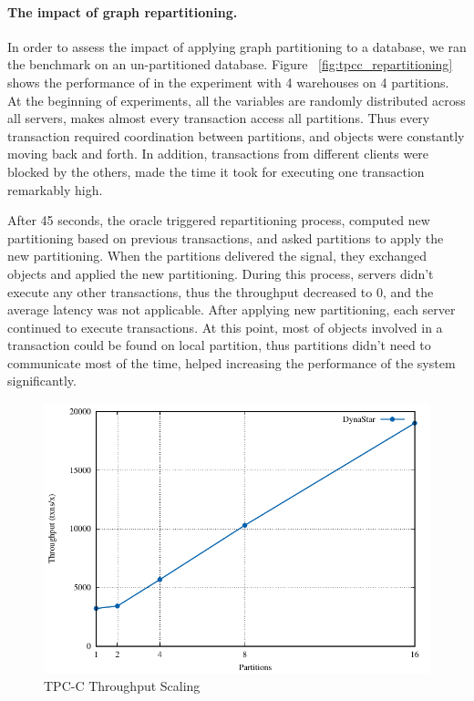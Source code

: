 \paragraph{The impact of graph repartitioning.}
In order to assess the impact of applying graph partitioning to a database, we
ran the benchmark on an un-partitioned database.  Figure ~\ref{fig:tpcc_repartitioning} 
shows the performance of \dynastar in the experiment with 4 warehouses on 4 partitions.
At the beginning of experiments, all the variables are randomly distributed across all 
servers, makes almost every transaction access all partitions. Thus every transaction 
required coordination between partitions, and objects were constantly moving back and forth. 
In addition, transactions from different clients were blocked by the others, 
made the time it took for executing one transaction remarkably high.


After 45 seconds, the oracle triggered repartitioning process, computed new partitioning 
based on previous transactions, and asked partitions to apply the new partitioning.
When the partitions delivered the signal, they exchanged objects and applied the new partitioning.
During this process, servers didn't execute any other transactions, thus the throughput decreased 
to 0, and the average latency was not applicable. After applying new partitioning, each 
server continued to execute transactions. At this point, most of objects involved in a transaction
could be found on local partition, thus partitions didn't need to communicate most of the time, helped
increasing the performance of the system significantly.

\begin{figure}[ht!]
  \centering
    \includegraphics[width=\columnwidth]{figures/experiments/tpcc-scaling/tpcc-scaling}
  \caption{TPC-C Throughput Scaling}
  \label{fig:tpcc_scaling}
\end{figure}

